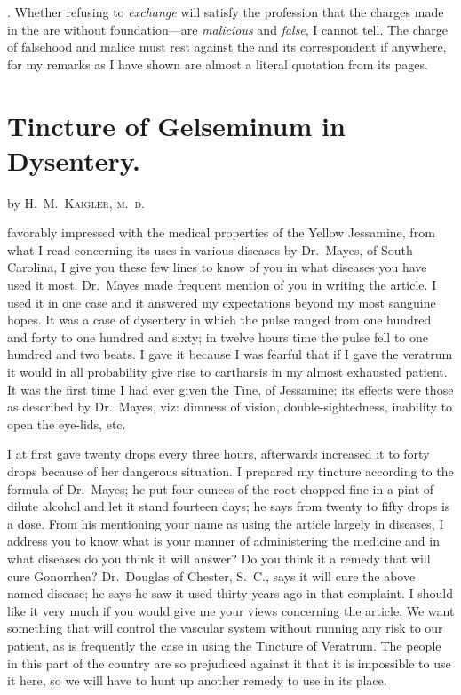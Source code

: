 . Whether refusing to \emph{exchange} will
satisfy the profession that the charges made in the  are without
foundation---are \emph{malicious} and \emph{false}, I cannot tell. The charge of falsehood
and malice must rest against the  and its correspondent
if anywhere, for my remarks as I have shown are almost a literal quotation
from its pages.

\section*{Tincture of Gelseminum in Dysentery.}

by \textsc{H.~M.~Kaigler, m.~d.}

 favorably impressed with the medical properties of the Yellow
Jessamine, from what I read concerning its uses in various diseases by
Dr.~Mayes, of South Carolina, I give you these few lines to know of
you in what diseases you have used it most. Dr.~Mayes made frequent
mention of you in writing the article. I used it in one case and it answered
my expectations beyond my most sanguine hopes. It was a case
of dysentery in which the pulse ranged from one hundred and forty to
one hundred and sixty; in twelve hours time the pulse fell to one hundred
and two beats. I gave it because I was fearful that if I gave the
veratrum it would in all probability give rise to cartharsis in my almost
exhausted patient. It was the first time I had ever given the Tine, of
Jessamine; its effects were those as described by Dr.~Mayes, viz: dimness
of vision, double-sightedness, inability to open the eye-lids, etc.

I at first gave twenty drops every three hours, afterwards increased it
to forty drops because of her dangerous situation. I prepared my tincture
according to the formula of Dr.~Mayes; he put four ounces of the
root chopped fine in a pint of dilute alcohol and let it stand fourteen days;
he says from twenty to fifty drops is a dose. From his mentioning your
name as using the article largely in diseases, I address you to know
what is your manner of administering the medicine and in what diseases
do you think it will answer? Do you think it a remedy that will
cure Gonorrhea? Dr.~Douglas of Chester, S.~C., says it will cure the above
named disease; he says he saw it used thirty years ago in that complaint.
I should like it very much if you would give me your views concerning
the article. We want something that will control the vascular system
without running any risk to our patient, as is frequently the case in
using the Tincture of Veratrum. The people in this part of the country
are so prejudiced against it that it is impossible to use it here, so we will
have to hunt up another remedy to use in its place.\endinput
